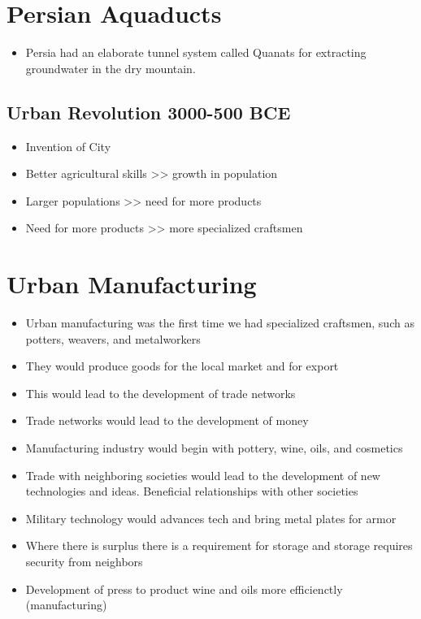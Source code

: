 \documentclass{article}
\begin{document}
\section*{Persian Aquaducts}
\begin{itemize}
  \item Persia had an elaborate tunnel system called
    Quanats for extracting groundwater in the dry mountain.
\end{itemize}

\subsection{Urban Revolution 3000-500 BCE}
\begin{itemize}
  \item Invention of City
  \item Better agricultural skills >> growth in population
  \item Larger populations >> need for more products
  \item Need for more products >> more specialized craftsmen
\end{itemize}

\section*{Urban Manufacturing}
\begin{itemize}
  \item Urban manufacturing was the first time we had
    specialized craftsmen, such as potters, weavers, and metalworkers
  \item They would produce goods for the local market and for export
  \item This would lead to the development of trade networks
  \item Trade networks would lead to the development of money
  \item Manufacturing industry would begin with pottery, wine,
    oils, and cosmetics
  \item Trade with neighboring societies would lead to the
    development of new technologies and ideas. Beneficial
    relationships with other societies
  \item Military technology would advances tech and bring metal plates for armor
  \item Where there is surplus there is a requirement for storage
    and storage requires security from neighbors
  \item Development of press to product wine and oils
    more efficienctly (manufacturing)
\end{itemize}
\end{document}
